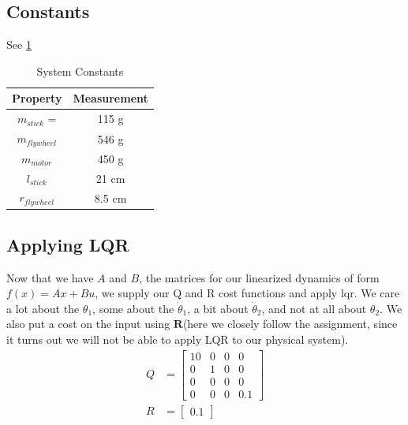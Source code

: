 \documentclass[conference]{IEEEtran}
\begin{document}
\subsection{Constants}
See \ref{tbl:constants}
\begin{table}[!h]
    \renewcommand{\arraystretch}{1.5}
    \caption{System Constants}
    \label{tbl:systemparameters}
    \centering
    \begin{tabular}{|c|c|}
        \hline
        Property & Measurement \\
        \hline
        $m_{stick}$ = & 115 g \\
        $m_{flywheel}$ & 546 g\\
        $m_{motor}$ & 450 g \\ %
        $l_{stick} $ & 21 cm \\
        $r_{flywheel}$ & 8.5 cm \\ %
        \hline
    \end{tabular}
    \label{tbl:constants}
\end{table}

\subsection{Applying LQR}

Now that we have $A$ and $B$, the matrices for our linearized dynamics of form
$f(x) = Ax + Bu$, we supply our Q and R cost functions and apply lqr. We care a
lot about the $\theta_1$, some about the $\dot\theta_1$, a bit about
$\dot\theta_2$, and not at all about $\theta_2$.  We also put a cost on the
input using $\textbf{R}$(here we closely follow the
assignment, since it turns out we will not be able to apply LQR to our physical
system).
\begin{align}
    Q &=
    \begin{bmatrix}
        10 & 0 & 0 & 0 \\
        0 & 1 & 0 & 0 \\
        0 & 0 & 0 & 0 \\
        0 & 0 & 0 & 0.1
    \end{bmatrix}\\
    R &= \begin{bmatrix} 0.1 \end{bmatrix}
\end{align}
\end{document}
